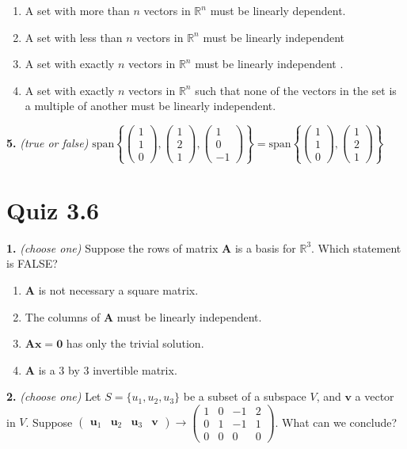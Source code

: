 \documentclass[10pt,a4paper]{article}
\begin{document}
\begin{enumerate}[label=(\Alph*)]
\item A set with more than \(n\) vectors in \(\mathbb{R}^n\) must be linearly dependent.
\item A set with less than \(n\) vectors in \(\mathbb{R}^n\) must be linearly independent
\item A set with exactly \(n\) vectors in \(\mathbb{R}^n\) must be linearly independent .
\item A set with exactly \(n\) vectors in \(\mathbb{R}^n\) such that none of the vectors in the set is a multiple of another must be linearly independent.
\end{enumerate}
\smallskip
\textbf{5.} \textit{(true or false)} \(\text{span}\left\{\begin{pmatrix}1\\1\\0\end{pmatrix},\begin{pmatrix}1\\2\\1\end{pmatrix},\begin{pmatrix}1\\0\\-1\end{pmatrix}\right\}=\text{span}\left\{\begin{pmatrix}1\\1\\0\end{pmatrix},\begin{pmatrix}1\\2\\1\end{pmatrix}\right\}\)

\smallskip
\section{Quiz 3.6}
\textbf{1.} \textit{(choose one)} Suppose the rows of matrix \(\mathbf{A}\) is a basis for \(\mathbb{R}^3\). Which statement is FALSE?

\begin{enumerate}[label=(\Alph*)]
\item \(\mathbf{A}\) is not necessary a square matrix.
\item The columns of \(\mathbf{A}\) must be linearly independent.
\item \(\mathbf{Ax=0}\) has only the trivial solution.
\item \(\mathbf{A}\) is a 3 by 3 invertible matrix.
\end{enumerate}
\smallskip
\textbf{2.} \textit{(choose one)} Let \(S=\{u_1,u_2,u_3\}\) be a subset of a subspace \(V\), and \(\mathbf{v} \) a vector in \(V\). Suppose \(\left(\begin{array}{ccc|c}\mathbf{u}_1&\mathbf{u}_2&\mathbf{u}_3&\mathbf{v}\end{array}\right)\rightarrow\left(\begin{array}{ccc|c}1&0&-1&2\\0&1&-1&1\\0&0&0&0\end{array}\right)\). What can we conclude?
\end{document}
